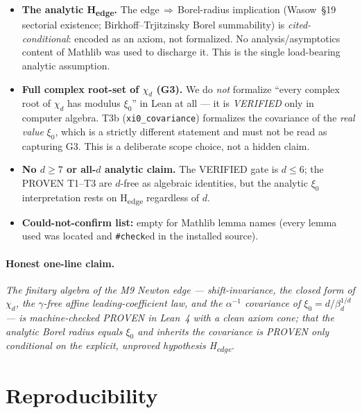 \documentclass[11pt]{article}
\newcommand{\xizero}{\xi_{0}}
\newcommand{\Hedge}{\textsf{H\textsubscript{edge}}}
\begin{document}
\begin{itemize}\setlength\itemsep{3pt}
  \item \textbf{The analytic \Hedge.} The edge\,$\Rightarrow$\,Borel-radius
        implication (Wasow~\S19 sectorial existence; Birkhoff--Trjitzinsky
        Borel summability) is \emph{cited-conditional}: encoded as an axiom,
        not formalized. No analysis/asymptotics content of Mathlib was used to
        discharge it. This is the single load-bearing analytic assumption.
  \item \textbf{Full complex root-set of $\chi_d$ (G3).} We do \emph{not}
        formalize ``every complex root of $\chi_d$ has modulus $\xizero$'' in
        Lean at all --- it is \emph{VERIFIED} only in computer algebra. T3b
        (\texttt{xi0\_covariance}) formalizes the covariance of the \emph{real
        value} $\xizero$, which is a strictly different statement and must not be
        read as capturing G3. This is a deliberate scope choice, not a hidden
        claim.
  \item \textbf{No $d\ge 7$ or all-$d$ analytic claim.} The VERIFIED gate is
        $d\le 6$; the PROVEN T1--T3 are $d$-free as algebraic identities, but
        the analytic $\xizero$ interpretation rests on \Hedge{} regardless of
        $d$.
  \item \textbf{Could-not-confirm list:} empty for Mathlib lemma names (every
        lemma used was located and \texttt{\#check}ed in the installed source).
\end{itemize}

\paragraph{Honest one-line claim.}
\emph{The finitary algebra of the M9 Newton edge --- shift-invariance, the
closed form of $\chi_d$, the $\gamma$-free affine leading-coefficient law, and
the $\alpha^{-1}$ covariance of $\xizero=d/\beta_d^{1/d}$ --- is machine-checked
PROVEN in Lean~4 with a clean axiom cone; that the analytic Borel radius equals
$\xizero$ and inherits the covariance is PROVEN only conditional on the explicit,
unproved hypothesis \Hedge.}

\section{Reproducibility}
\end{document}
